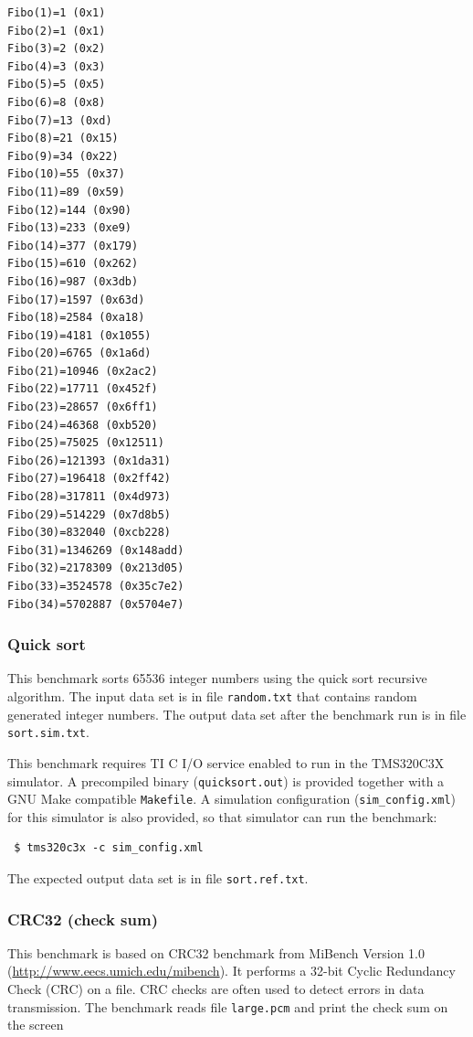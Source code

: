 \begin{verbatim}
Fibo(1)=1 (0x1)
Fibo(2)=1 (0x1)
Fibo(3)=2 (0x2)
Fibo(4)=3 (0x3)
Fibo(5)=5 (0x5)
Fibo(6)=8 (0x8)
Fibo(7)=13 (0xd)
Fibo(8)=21 (0x15)
Fibo(9)=34 (0x22)
Fibo(10)=55 (0x37)
Fibo(11)=89 (0x59)
Fibo(12)=144 (0x90)
Fibo(13)=233 (0xe9)
Fibo(14)=377 (0x179)
Fibo(15)=610 (0x262)
Fibo(16)=987 (0x3db)
Fibo(17)=1597 (0x63d)
Fibo(18)=2584 (0xa18)
Fibo(19)=4181 (0x1055)
Fibo(20)=6765 (0x1a6d)
Fibo(21)=10946 (0x2ac2)
Fibo(22)=17711 (0x452f)
Fibo(23)=28657 (0x6ff1)
Fibo(24)=46368 (0xb520)
Fibo(25)=75025 (0x12511)
Fibo(26)=121393 (0x1da31)
Fibo(27)=196418 (0x2ff42)
Fibo(28)=317811 (0x4d973)
Fibo(29)=514229 (0x7d8b5)
Fibo(30)=832040 (0xcb228)
Fibo(31)=1346269 (0x148add)
Fibo(32)=2178309 (0x213d05)
Fibo(33)=3524578 (0x35c7e2)
Fibo(34)=5702887 (0x5704e7)
\end{verbatim}

\subsubsection{Quick sort}

This benchmark sorts 65536 integer numbers using the quick sort recursive algorithm.
The input data set is in file \texttt{random.txt} that contains random generated integer numbers.
The output data set after the benchmark run is in file \texttt{sort.sim.txt}.

This benchmark requires TI C I/O service enabled to run in the TMS320C3X simulator.
A precompiled binary (\texttt{quicksort.out}) is provided together with a GNU Make compatible \texttt{Makefile}.
A simulation configuration (\texttt{sim\_config.xml}) for this simulator is also provided, so that simulator can run the benchmark:

\begin{verbatim}
 $ tms320c3x -c sim_config.xml
\end{verbatim}

\noindent The expected output data set is in file \texttt{sort.ref.txt}.

\subsubsection{CRC32 (check sum)}

This benchmark is based on CRC32 benchmark from MiBench Version 1.0 (\url{http://www.eecs.umich.edu/mibench}).
It performs a 32-bit Cyclic Redundancy Check (CRC) on a file. CRC checks are often used to detect errors in data transmission.
The benchmark reads file \texttt{large.pcm} and print the check sum on the screen

